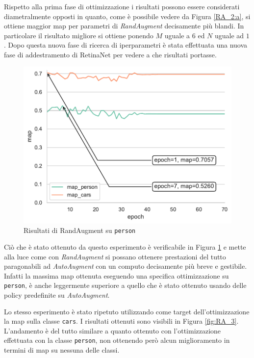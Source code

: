 Rispetto alla prima fase di ottimizzazione i risultati possono essere considerati diametralmente opposti in quanto, come è possibile vedere da Figura \ref{RA_2:a}, si ottiene maggior \ac{map} per parametri di \textit{RandAugment} decisamente più blandi. In particolare il risultato migliore si ottiene ponendo $M$ uguale a $6$ ed $N$ uguale ad $1$.
Dopo questa nuova fase di ricerca di iperparametri è stata effettuata una nuova fase di addestramento di RetinaNet per vedere a che risultati portasse.
\begin{figure}[]
    \centering
    \includegraphics[width=\textwidth]{images/graphic/map_person_ra.pdf}
    \caption{Risultati di RandAugment su \texttt{person}}
    \label{fig:ra_person}
\end{figure}

Ciò che è stato ottenuto da questo esperimento è verificabile in Figura \ref{fig:ra_person} e mette alla luce come con \textit{RandAugment} si possano ottenere prestazioni del tutto paragonabili ad \textit{AutoAugment} con un computo decisamente più breve e gestibile. Infatti la massima \ac{map} ottenuta eseguendo una specifica ottimizzazione su \texttt{person}, è anche leggermente superiore a quello che è stato ottenuto usando delle policy predefinite su \textit{AutoAugment}.

Lo stesso esperimento è stato ripetuto utilizzando come target dell'ottimizzazione la \ac{map} sulla classe \texttt{cars}. I risultati ottenuti sono visibili in Figura \ref{fig:RA_3}.
L'andamento è del tutto similare a quanto ottenuto con l'ottimizzazione effettuata con la classe \texttt{person}, non ottenendo però alcun miglioramento in termini di \ac{map} su nessuna delle classi.


